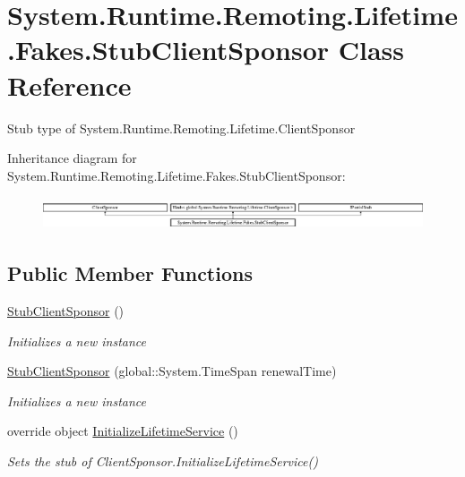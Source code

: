 \hypertarget{class_system_1_1_runtime_1_1_remoting_1_1_lifetime_1_1_fakes_1_1_stub_client_sponsor}{\section{System.\-Runtime.\-Remoting.\-Lifetime.\-Fakes.\-Stub\-Client\-Sponsor Class Reference}
\label{class_system_1_1_runtime_1_1_remoting_1_1_lifetime_1_1_fakes_1_1_stub_client_sponsor}
}


Stub type of System.\-Runtime.\-Remoting.\-Lifetime.\-Client\-Sponsor 


Inheritance diagram for System.\-Runtime.\-Remoting.\-Lifetime.\-Fakes.\-Stub\-Client\-Sponsor\-:\begin{figure}[H]
\begin{center}
\leavevmode
\includegraphics[height=0.974761cm]{class_system_1_1_runtime_1_1_remoting_1_1_lifetime_1_1_fakes_1_1_stub_client_sponsor}
\end{center}
\end{figure}
\subsection*{Public Member Functions}
\begin{DoxyCompactItemize}
\item 
\hyperlink{class_system_1_1_runtime_1_1_remoting_1_1_lifetime_1_1_fakes_1_1_stub_client_sponsor_a966b7ecd2c3605b66dda9506d4f6fbe8}{Stub\-Client\-Sponsor} ()
\begin{DoxyCompactList}\small\item\em Initializes a new instance\end{DoxyCompactList}\item 
\hyperlink{class_system_1_1_runtime_1_1_remoting_1_1_lifetime_1_1_fakes_1_1_stub_client_sponsor_a3cee06f06b9e30bda7caa71024635d9a}{Stub\-Client\-Sponsor} (global\-::\-System.\-Time\-Span renewal\-Time)
\begin{DoxyCompactList}\small\item\em Initializes a new instance\end{DoxyCompactList}\item 
override object \hyperlink{class_system_1_1_runtime_1_1_remoting_1_1_lifetime_1_1_fakes_1_1_stub_client_sponsor_a5d7ac2f0d4883fd4ad4f6eee2f8bd689}{Initialize\-Lifetime\-Service} ()
\begin{DoxyCompactList}\small\item\em Sets the stub of Client\-Sponsor.\-Initialize\-Lifetime\-Service()\end{DoxyCompactList}\end{DoxyCompactItemize}
